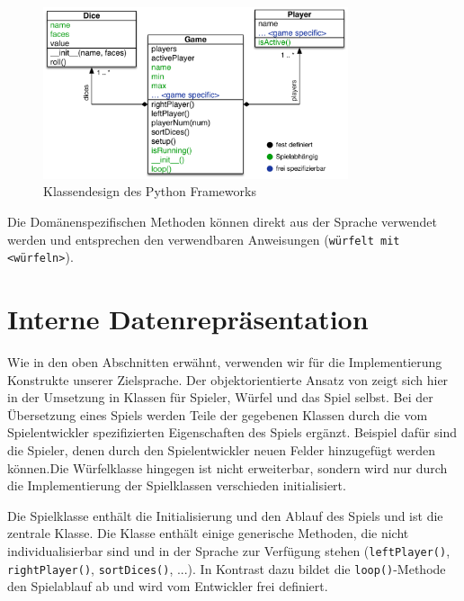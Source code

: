    \begin{figure}[ht]
    	\centering
        \includegraphics[width=0.8\textwidth]{Python-UML.pdf}
    	\caption{Klassendesign des Python Frameworks}
    	\label{python-uml}
    \end{figure}
    
    Die Domänenspezifischen Methoden können direkt aus der Sprache verwendet werden und entsprechen den verwendbaren Anweisungen (\texttt{würfelt mit <würfeln>}).
    
\section{Interne Datenrepräsentation} %
\label{sec:interne_datenreprasentation}
    Wie in den oben Abschnitten erwähnt, verwenden wir für die Implementierung Konstrukte unserer Zielsprache. Der objektorientierte Ansatz von \dg zeigt sich hier in der Umsetzung in Klassen für Spieler, Würfel und das Spiel selbst. Bei der Übersetzung eines Spiels werden Teile der gegebenen Klassen durch die vom Spielentwickler spezifizierten Eigenschaften des Spiels ergänzt. Beispiel dafür sind die Spieler, denen durch den Spielentwickler neuen Felder hinzugefügt werden können.Die Würfelklasse hingegen ist nicht erweiterbar, sondern wird nur durch die Implementierung der Spielklassen verschieden initialisiert.
    
    Die Spielklasse enthält die Initialisierung und den Ablauf des Spiels und ist die zentrale Klasse. Die Klasse enthält einige generische Methoden, die nicht individualisierbar sind und in der Sprache zur Verfügung stehen (\texttt{leftPlayer()}, \texttt{rightPlayer()}, \texttt{sortDices()}, ...). In Kontrast dazu bildet die \texttt{loop()}-Methode den Spielablauf ab und wird vom Entwickler frei definiert.
    


